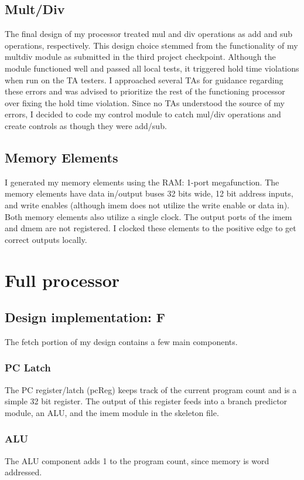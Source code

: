 \documentclass[letterpaper]{article} %
\begin{document}
\subsection{Mult/Div}
The final design of my processor treated mul and div operations as add and sub operations, respectively. This design choice stemmed from the functionality of my multdiv module as submitted in the third project checkpoint. Although the module functioned well and passed all local tests, it triggered hold time violations when run on the TA testers. I approached several TAs for guidance regarding these errors and was advised to prioritize the rest of the functioning processor over fixing the hold time violation. Since no TAs understood the source of my errors, I decided to code my control module to catch mul/div operations and create controls as though they were add/sub.
\subsection{Memory Elements}
I generated my memory elements using the RAM: 1-port megafunction. The memory elements have data in/output buses 32 bits wide, 12 bit address inputs, and write enables (although imem does not utilize the write enable or data in). Both memory elements also utilize a single clock. The output ports of the imem and dmem are not registered. I clocked these elements to the positive edge to get correct outputs locally.

\section{Full processor}
\subsection{Design implementation: F}
The fetch portion of my design contains a few main components.
\subsubsection{PC Latch}
The PC register/latch (pcReg) keeps track of the current program count and is a simple 32 bit register. The output of this register feeds into a branch predictor module, an ALU, and the imem module in the skeleton file.
\subsubsection{ALU}
The ALU component adds 1 to the program count, since memory is word addressed. 
\end{document}
